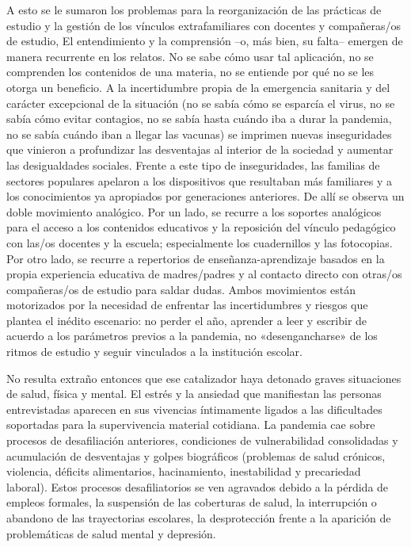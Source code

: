 A esto se le sumaron los problemas para la reorganización de las prácticas de estudio y la gestión de los vínculos extrafamiliares con docentes y compañeras/os de estudio, El entendimiento y la comprensión --o, más bien, su falta-- emergen de manera recurrente en los relatos. No se sabe cómo usar tal aplicación, no se comprenden los contenidos de una materia, no se entiende por qué no se les otorga un beneficio. A la incertidumbre propia de la emergencia sanitaria y del carácter excepcional de la situación (no se sabía cómo se esparcía el virus, no se sabía cómo evitar contagios, no se sabía hasta cuándo iba a durar la pandemia, no se sabía cuándo iban a llegar las vacunas) se imprimen nuevas inseguridades que vinieron a profundizar las desventajas al interior de la sociedad y aumentar las desigualdades sociales. Frente a este tipo de inseguridades, las familias de sectores populares apelaron a los dispositivos que resultaban más familiares y a los conocimientos ya apropiados por generaciones anteriores. De allí se observa un doble movimiento analógico. Por un lado, se recurre a los soportes analógicos para el acceso a los contenidos educativos y la reposición del vínculo pedagógico con las/os docentes y la escuela; especialmente los cuadernillos y las fotocopias. Por otro lado, se recurre a repertorios de enseñanza-aprendizaje basados en la propia experiencia educativa de madres/padres y al contacto directo con otras/os compañeras/os de estudio para saldar dudas. Ambos movimientos están motorizados por la necesidad de enfrentar las incertidumbres y riesgos que plantea el inédito escenario: no perder el año, aprender a leer y escribir de acuerdo a los parámetros previos a la pandemia, no «desengancharse» de los ritmos de estudio y seguir vinculados a la institución escolar.

No resulta extraño entonces que ese catalizador haya detonado graves situaciones de salud, física y mental. El estrés y la ansiedad que manifiestan las personas entrevistadas aparecen en sus vivencias íntimamente ligados a las dificultades soportadas para la supervivencia material cotidiana. La pandemia cae sobre procesos de desafiliación anteriores, condiciones de vulnerabilidad consolidadas y acumulación de desventajas y golpes biográficos (problemas de salud crónicos, violencia, déficits alimentarios, hacinamiento, inestabilidad y precariedad laboral). Estos procesos desafiliatorios se ven agravados debido a la pérdida de empleos formales, la suspensión de las coberturas de salud, la interrupción o abandono de las trayectorias escolares, la desprotección frente a la aparición de problemáticas de salud mental y depresión.

